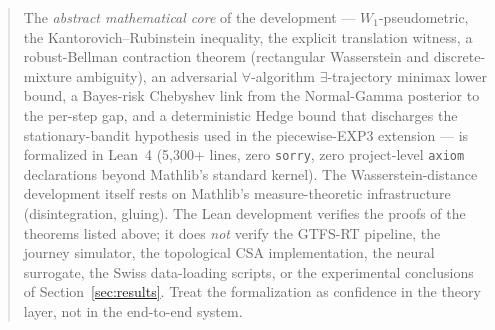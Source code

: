 \documentclass[11pt]{article}
\theoremstyle{definition}
\theoremstyle{remark}
\begin{document}
\begin{abstract}
The \emph{abstract mathematical core} of the development ---
$W_1$-pseudometric, the Kantorovich--Rubinstein inequality, the
explicit translation witness, a robust-Bellman contraction theorem
(rectangular Wasserstein and discrete-mixture ambiguity), an
adversarial $\forall$-algorithm $\exists$-trajectory minimax lower
bound, a Bayes-risk Chebyshev link from the Normal-Gamma posterior
to the per-step gap, and a deterministic Hedge bound that discharges
the stationary-bandit hypothesis used in the piecewise-EXP3 extension
--- is formalized in Lean~4 (5{,}300+ lines, zero \texttt{sorry},
zero project-level \texttt{axiom} declarations beyond
Mathlib's standard kernel). The Wasserstein-distance development itself
rests on Mathlib's measure-theoretic infrastructure (disintegration,
gluing). The Lean development verifies the proofs of the theorems
listed above; it does \emph{not} verify the GTFS-RT pipeline, the
journey simulator, the topological CSA implementation, the neural
surrogate, the Swiss data-loading scripts, or the experimental
conclusions of Section~\ref{sec:results}. Treat the formalization
as confidence in the theory layer, not in the end-to-end system.


\end{abstract}
\end{document}
